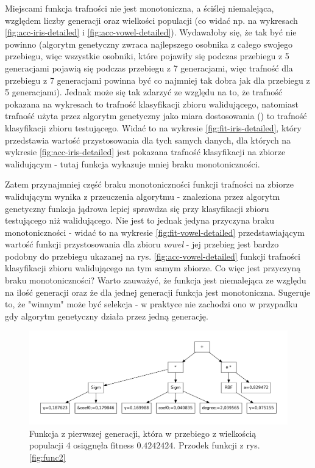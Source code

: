 \documentclass{article}
\begin{document}
	Miejscami funkcja trafności nie jest monotoniczna, a ściślej niemalejąca, względem liczby generacji oraz wielkości populacji (co widać np. na wykresach \ref{fig:acc-iris-detailed} i \ref{fig:acc-vowel-detailed}). Wydawałoby się, że tak być nie powinno (algorytm genetyczny zwraca najlepszego osobnika z całego swojego przebiegu, więc wszystkie osobniki, które pojawiły się podczas przebiegu z 5 generacjami pojawią się podczas przebiegu z 7 generacjami, więc trafność dla przebiegu z 7 generacjami powinna być co najmniej tak dobra jak dla przebiegu z 5 generacjami). Jednak może się tak zdarzyć ze względu na to, że trafność pokazana na wykresach to trafność klasyfikacji zbioru walidującego, natomiast trafność użyta przez algorytm genetyczny jako miara dostosowania () to trafność klasyfikacji zbioru testującego. Widać to na wykresie \ref{fig:fit-iris-detailed}, który przedstawia wartość przystosowania dla tych samych danych, dla których na wykresie \ref{fig:acc-iris-detailed} jest pokazana trafność klasyfikacji na zbiorze walidującym - tutaj funkcja wykazuje mniej braku monotoniczności. 
	
	Zatem przynajmniej część braku monotoniczności funkcji trafności na zbiorze walidującym wynika z przeuczenia algorytmu - znaleziona przez algorytm genetyczny funkcja jądrowa lepiej sprawdza się przy klasyfikacji zbioru testującego niż walidującego. Nie jest to jednak jedyna przyczyna braku monotoniczności - widać to na wykresie \ref{fig:fit-vowel-detailed} przedstawiającym wartość funkcji przystosowania dla zbioru \emph{vowel} - jej przebieg jest bardzo podobny do przebiegu ukazanej na rys. \ref{fig:acc-vowel-detailed} funkcji trafności klasyfikacji zbioru walidującego na tym samym zbiorze. Co więc jest przyczyną braku monotoniczności? Warto zauważyć, że funkcja jest niemalejąca ze względu na ilość generacji oraz że dla jednej generacji funkcja jest monotoniczna. Sugeruje to, że "winnym" może być selekcja - w praktyce nie zachodzi ono w przypadku gdy algorytm genetyczny działa przez jedną generację.
    
    \begin{figure}[H]
		\includegraphics[scale=0.50]{figures/functions/func1}
		\caption{Funkcja z pierwszej generacji, która w przebiego z wielkością populacji 4 osiągnęła fitness $0.4242424$. Przodek funkcji z rys.\ref{fig:func2} \label{fig:func1}}
	\end{figure}
	
\end{document}
